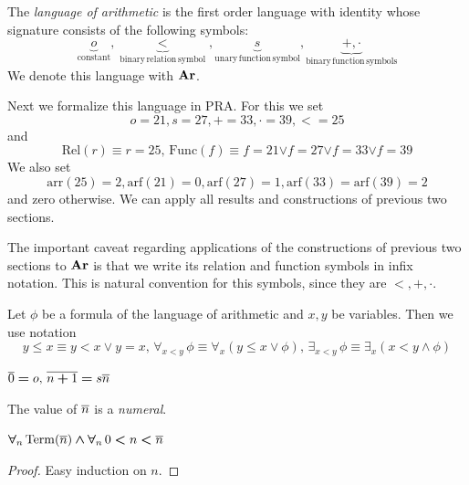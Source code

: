 \documentclass[10pt]{amsart}
\newcommand{\mforall}{\boldsymbol{\forall}}
\newcommand{\mand}{\boldsymbol{\wedge}}
\newcommand{\mor}{\boldsymbol{\vee}}
\newcommand{\mle}{\boldsymbol{<}}
\newcommand{\meq}{\boldsymbol{=}}
\newcommand{\mplus}{\boldsymbol{+}}
\begin{document}
\begin{definition}
	The \textit{language of arithmetic} is the first order language with identity whose signature consists of the following symbols:
	$$\underbrace{o}_{\mathrm{constant}},\underbrace{<}_{\mathrm{binary\,relation\,symbol}},\underbrace{s}_{\mathrm{unary\,function\,symbol}},\underbrace{+,\cdot}_{\mathrm{binary\,function\,symbols}}$$
	We denote this language with $\mathbf{Ar}$.
\end{definition}
\noindent
Next we formalize this language in $\mathrm{PRA}$. For this we set
$$o \meq 21, s \meq 27, + \meq 33, \cdot \meq 39, < \meq 25$$
and
$$\mathrm{Rel}(r) \equiv r \meq 25,\,\mathrm{Func}(f) \equiv f \meq 21 \mor f \meq 27 \mor f \meq 33 \mor f \meq 39$$
We also set
$$\mathrm{arr}(25) \meq 2, \mathrm{arf}(21) \meq 0,\mathrm{arf}(27) \meq 1,\mathrm{arf}(33) \meq \mathrm{arf}(39) \meq 2$$
and zero otherwise. We can apply all results and constructions of previous two sections. 

\begin{remark}\label{remark:infix_notation_for_addition_and_multiplication}
  The important caveat regarding applications of the constructions of previous two sections to $\mathbf{Ar}$ is that we write its relation and function symbols in infix notation. This is natural convention for this symbols, since they are $<,+,\cdot$. 
\end{remark}

\begin{remark}\label{remark:bounded_quantifiers_arithmetic_language}
	Let $\phi$ be a formula of the language of arithmetic and $x,y$ be variables. Then we use notation
  $$y \leq x \equiv y < x \vee y = x,\,\forall_{x < y}\,\phi \equiv \forall_x\left(y \leq x \vee \phi\right),\,\exists_{x < y}\,\phi \equiv \exists_x\left(x < y \wedge \phi\right)$$
\end{remark}

\begin{definition}
  $\ol{0} \meq o,\,\ol{n \mplus 1} \meq s\ol{n}$

  The value of $\overline{n}$ is a \textit{numeral}.
\end{definition}

\begin{fact}\label{fact:basic_properties_of_numerals}
  $\mforall_n\,\mathrm{Term}(\ol{n}) \mand \mforall_n\,0 \mle n \mle \ol{n}$ 
\end{fact}
\begin{proof}
  Easy induction on $n$.
\end{proof}
\end{document}
